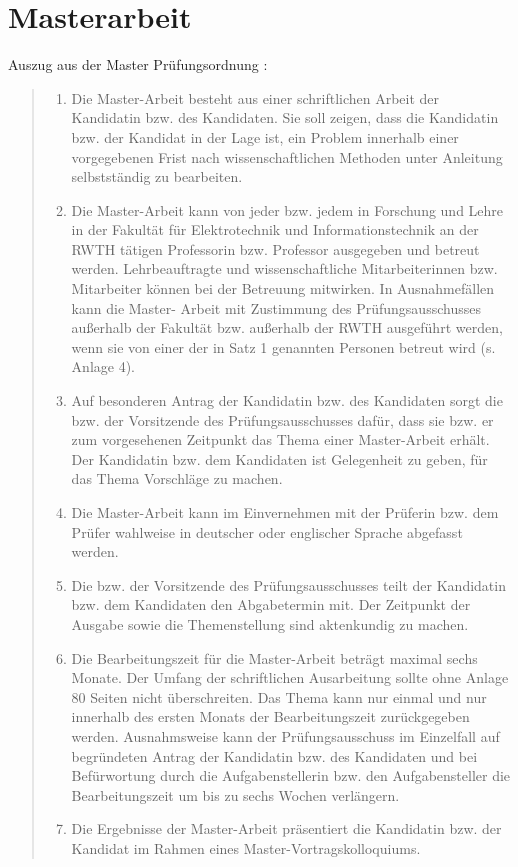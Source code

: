 \section{Masterarbeit}
Auszug aus der Master Prüfungsordnung \cite{MPO-10-2010}:
\begin{quote}
	\begin{enumerate}\setlength{\itemsep}{0pt}
		\setlength{\parsep}{0pt}
		\item Die Master-Arbeit besteht aus einer schriftlichen Arbeit der Kandidatin bzw. des Kandidaten.
		Sie soll zeigen, dass die Kandidatin bzw. der Kandidat in der Lage ist, ein Problem innerhalb
		einer vorgegebenen Frist nach wissenschaftlichen Methoden unter Anleitung selbstständig
		zu bearbeiten.
		\item Die Master-Arbeit kann von jeder bzw. jedem in Forschung und Lehre in der Fakultät für
		Elektrotechnik und Informationstechnik an der RWTH tätigen Professorin bzw. Professor
		ausgegeben und betreut werden. Lehrbeauftragte und wissenschaftliche Mitarbeiterinnen
		bzw. Mitarbeiter können bei der Betreuung mitwirken. In Ausnahmefällen kann die Master-
		Arbeit mit Zustimmung des Prüfungsausschusses außerhalb der Fakultät bzw. außerhalb
		der RWTH ausgeführt werden, wenn sie von einer der in Satz 1 genannten Personen betreut
		wird (s. Anlage 4).
		\item Auf besonderen Antrag der Kandidatin bzw. des Kandidaten sorgt die bzw. der Vorsitzende
		des Prüfungsausschusses dafür, dass sie bzw. er zum vorgesehenen Zeitpunkt das Thema
		einer Master-Arbeit erhält. Der Kandidatin bzw. dem Kandidaten ist Gelegenheit zu geben,
		für das Thema Vorschläge zu machen.
		\item Die Master-Arbeit kann im Einvernehmen mit der Prüferin bzw. dem Prüfer wahlweise in
		deutscher oder englischer Sprache abgefasst werden.
		\item Die bzw. der Vorsitzende des Prüfungsausschusses teilt der Kandidatin bzw. dem Kandidaten den Abgabetermin mit. Der Zeitpunkt der Ausgabe sowie die Themenstellung sind aktenkundig zu machen.
		\item Die Bearbeitungszeit für die Master-Arbeit beträgt maximal sechs Monate. Der Umfang der
		schriftlichen Ausarbeitung sollte ohne Anlage 80 Seiten nicht überschreiten. Das Thema kann nur einmal und nur innerhalb des ersten Monats der Bearbeitungszeit zurückgegeben
		werden. Ausnahmsweise kann der Prüfungsausschuss im Einzelfall auf begründeten Antrag
		der Kandidatin bzw. des Kandidaten und bei Befürwortung durch die Aufgabenstellerin bzw.
		den Aufgabensteller die Bearbeitungszeit um bis zu sechs Wochen verlängern.
		\item Die Ergebnisse der Master-Arbeit präsentiert die Kandidatin bzw. der Kandidat im Rahmen
		eines Master-Vortragskolloquiums.
	\end{enumerate}
\end{quote}


